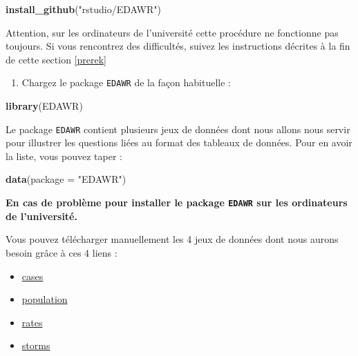 \documentclass[a4paperpaper,]{article}
\newenvironment{Shaded}{\begin{snugshade}}{\end{snugshade}}
\newcommand{\DataTypeTok}[1]{\textcolor[rgb]{0.00,0.34,0.68}{#1}}
\newcommand{\KeywordTok}[1]{\textcolor[rgb]{0.12,0.11,0.11}{\textbf{#1}}}
\newcommand{\NormalTok}[1]{\textcolor[rgb]{0.12,0.11,0.11}{#1}}
\newcommand{\StringTok}[1]{\textcolor[rgb]{0.75,0.01,0.01}{#1}}
\providecommand{\tightlist}{%
  \setlength{\itemsep}{0pt}\setlength{\parskip}{0pt}}
\theoremstyle{definition}
\theoremstyle{definition}
\theoremstyle{definition}
\theoremstyle{remark}
\begin{document}
\begin{Shaded}
\begin{Highlighting}[]
\KeywordTok{install_github}\NormalTok{(}\StringTok{"rstudio/EDAWR"}\NormalTok{)}
\end{Highlighting}
\end{Shaded}

Attention, sur les ordinateurs de l'université cette procédure ne
fonctionne pas toujours. Si vous rencontrez des difficultés, suivez les
instructions décrites à la fin de cette section \ref{prerek}

\begin{enumerate}
\def\labelenumi{\arabic{enumi}.}
\setcounter{enumi}{2}
\tightlist
\item
  Chargez le package \texttt{EDAWR} de la façon habituelle :
\end{enumerate}

\begin{Shaded}
\begin{Highlighting}[]
\KeywordTok{library}\NormalTok{(EDAWR)}
\end{Highlighting}
\end{Shaded}

Le package \texttt{EDAWR} contient plusieurs jeux de données dont nous
allons nous servir pour illustrer les questions liées au format des
tableaux de données. Pour en avoir la liste, vous pouvez taper :

\begin{Shaded}
\begin{Highlighting}[]
\KeywordTok{data}\NormalTok{(}\DataTypeTok{package =} \StringTok{"EDAWR"}\NormalTok{)}
\end{Highlighting}
\end{Shaded}

\textbf{En cas de problème pour installer le package \texttt{EDAWR} sur
les ordinateurs de l'université.}

Vous pouvez télécharger manuellement les 4 jeux de données dont nous
aurons besoin grâce à ces 4 liens :

\begin{itemize}
\tightlist
\item
  \href{data/cases.rdata}{cases}
\item
  \href{data/population.rdata}{population}
\item
  \href{data/rates.rdata}{rates}
\item
  \href{data/storms.rdata}{storms}
\end{itemize}
\end{document}
